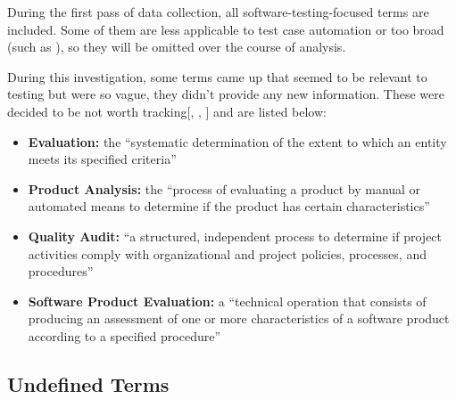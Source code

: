 During the first pass of data collection, all software-testing-focused terms
are included. Some of them are less applicable to test case automation
\fi or too
broad (such as \fi), so they
will be omitted over the course of analysis.

\ifnotpaper
      During this investigation, some terms came up that seemed to be relevant to
      testing but were so vague, they didn't provide any new information. These were
      decided to be not worth tracking[, ,
            ] and are listed below:

      \begin{itemize}
            \item \textbf{Evaluation:} the ``systematic determination of the extent
                  to which an entity meets its specified criteria''
                  \citep[p.~167]{IEEE2017}
            \item \textbf{Product Analysis:} the ``process of evaluating a product by
                  manual or automated means to determine if the product has certain
                  characteristics'' \citep[p.~343]{IEEE2017}
            \item \textbf{Quality Audit:} ``a structured, independent process to
                  determine if project activities comply with organizational and
                  project policies, processes, and procedures'' \citep[p.~361]{IEEE2017}
            \item \textbf{Software Product Evaluation:} a ``technical operation that
                  consists of producing an assessment of one or more characteristics
                  of a software product according to a specified procedure''
                  \citep[p.~424]{IEEE2017}
      \end{itemize}
\fi
\subsection{Undefined Terms}
\label{undef-terms}


\newcount\TotalBefore
\newcount\TotalAfter
\newcount\UndefBefore
\newcount\UndefAfter



